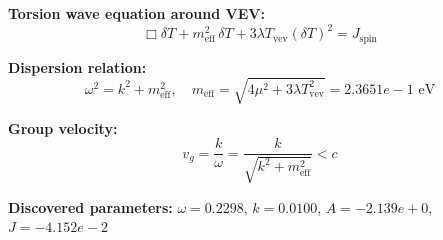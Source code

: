 
\textbf{Torsion wave equation around VEV:}
\begin{equation}
  \Box \delta T + m_{\text{eff}}^2 \, \delta T + 3\lambda T_{\text{vev}} (\delta T)^2 = J_{\text{spin}}
\end{equation}

\textbf{Dispersion relation:}
\begin{equation}
  \omega^2 = k^2 + m_{\text{eff}}^2, \quad
  m_{\text{eff}} = \sqrt{4\mu^2 + 3\lambda T_{\text{vev}}^2} = 2.3651e-1 \text{ eV}
\end{equation}

\textbf{Group velocity:}
\begin{equation}
  v_g = \frac{k}{\omega} = \frac{k}{\sqrt{k^2 + m_{\text{eff}}^2}} < c
\end{equation}

\textbf{Discovered parameters:}
$\omega = 0.2298$, \quad
$k = 0.0100$, \quad
$A = -2.139e+0$, \quad
$J = -4.152e-2$